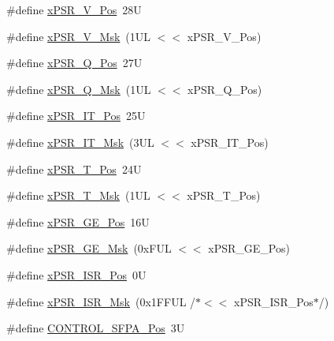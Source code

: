 \begin{DoxyCompactItemize}
\item 
\#define \mbox{\hyperlink{group___c_m_s_i_s___c_o_r_e_gae0cfbb394490db402623d97e6a979e00}{x\+P\+S\+R\+\_\+\+V\+\_\+\+Pos}}~28U
\item 
\#define \mbox{\hyperlink{group___c_m_s_i_s___c_o_r_e_gab07f94ed3b6ee695f5af719dc27995c2}{x\+P\+S\+R\+\_\+\+V\+\_\+\+Msk}}~(1\+U\+L $<$$<$ x\+P\+S\+R\+\_\+\+V\+\_\+\+Pos)
\item 
\#define \mbox{\hyperlink{group___c_m_s_i_s___c_o_r_e_gaabb4178d50676a8f19cf8f727f38ace8}{x\+P\+S\+R\+\_\+\+Q\+\_\+\+Pos}}~27U
\item 
\#define \mbox{\hyperlink{group___c_m_s_i_s___c_o_r_e_ga133ac393c38559ae43ac36383e731dd4}{x\+P\+S\+R\+\_\+\+Q\+\_\+\+Msk}}~(1\+U\+L $<$$<$ x\+P\+S\+R\+\_\+\+Q\+\_\+\+Pos)
\item 
\#define \mbox{\hyperlink{group___c_m_s_i_s___c_o_r_e_gac5be1db1343f776ecd00f0a4ebe70a46}{x\+P\+S\+R\+\_\+\+I\+T\+\_\+\+Pos}}~25U
\item 
\#define \mbox{\hyperlink{group___c_m_s_i_s___c_o_r_e_ga6dc177aab488851bb3b98cf4b420141a}{x\+P\+S\+R\+\_\+\+I\+T\+\_\+\+Msk}}~(3\+U\+L $<$$<$ x\+P\+S\+R\+\_\+\+I\+T\+\_\+\+Pos)
\item 
\#define \mbox{\hyperlink{group___c_m_s_i_s___c_o_r_e_ga98d801da9a49cda944f52aeae104dd38}{x\+P\+S\+R\+\_\+\+T\+\_\+\+Pos}}~24U
\item 
\#define \mbox{\hyperlink{group___c_m_s_i_s___c_o_r_e_ga30ae2111816e82d47636a8d4577eb6ee}{x\+P\+S\+R\+\_\+\+T\+\_\+\+Msk}}~(1\+U\+L $<$$<$ x\+P\+S\+R\+\_\+\+T\+\_\+\+Pos)
\item 
\#define \mbox{\hyperlink{group___c_m_s_i_s___c_o_r_e_gae2b0f3def0f378e9f1d10a4c727a064b}{x\+P\+S\+R\+\_\+\+G\+E\+\_\+\+Pos}}~16U
\item 
\#define \mbox{\hyperlink{group___c_m_s_i_s___c_o_r_e_ga967634e605d013e9b07002eca31f7903}{x\+P\+S\+R\+\_\+\+G\+E\+\_\+\+Msk}}~(0x\+F\+U\+L $<$$<$ x\+P\+S\+R\+\_\+\+G\+E\+\_\+\+Pos)
\item 
\#define \mbox{\hyperlink{group___c_m_s_i_s___c_o_r_e_ga21bff245fb1aef9683f693d9d7bb2233}{x\+P\+S\+R\+\_\+\+I\+S\+R\+\_\+\+Pos}}~0U
\item 
\#define \mbox{\hyperlink{group___c_m_s_i_s___c_o_r_e_gadf8eed87e0081dfe1ef1c78a0ea91afd}{x\+P\+S\+R\+\_\+\+I\+S\+R\+\_\+\+Msk}}~(0x1\+F\+F\+U\+L /$\ast$$<$$<$ x\+P\+S\+R\+\_\+\+I\+S\+R\+\_\+\+Pos$\ast$/)
\item 
\#define \mbox{\hyperlink{group___c_m_s_i_s___c_o_r_e_gac4eb493f7e00c0b286f6663b2554d5f1}{C\+O\+N\+T\+R\+O\+L\+\_\+\+S\+F\+P\+A\+\_\+\+Pos}}~3U
$$
\end{DoxyCompactItemize}
